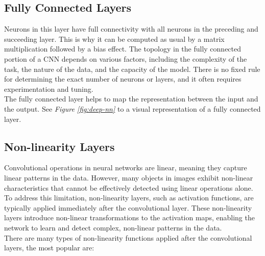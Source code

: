\subsection{Fully Connected Layers}

Neurons in this layer have full connectivity with all neurons in the preceding and succeeding layer. This is why it can be computed as usual by a matrix multiplication followed by a bias effect. The topology in the fully connected portion of a CNN depends on various factors, including the complexity of the task, the nature of the data, and the capacity of the model. There is no fixed rule for determining the exact number of neurons or layers, and it often requires experimentation and tuning. \\

The fully connected layer helps to map the representation between the input and the output. See \textit{Figure \ref{fig:deep-nn}} to a visual representation of a fully connected layer. \\

\subsection{Non-linearity Layers}

Convolutional operations in neural networks are linear, meaning they capture linear patterns in the data. However, many objects in images exhibit non-linear characteristics that cannot be effectively detected using linear operations alone. To address this limitation, non-linearity layers, such as activation functions, are typically applied immediately after the convolutional layer. These non-linearity layers introduce non-linear transformations to the activation maps, enabling the network to learn and detect complex, non-linear patterns in the data. \\

There are many types of non-linearity functions applied after the convolutional layers, the most popular are: \\

